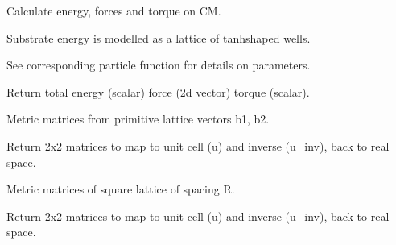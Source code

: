 \documentclass[letterpaper,10pt,english]{sphinxmanual}
\begin{document}
\begin{fulllineitems}
\label{\detokenize{tool_create_substrate:tool_create_substrate.calc_en_tanh}}
\pysigstartsignatures
{}
\pysigstopsignatures
\sphinxAtStartPar
Calculate energy, forces and torque on CM.

\sphinxAtStartPar
Substrate energy is modelled as a lattice of tanh\sphinxhyphen{}shaped wells.

\sphinxAtStartPar
See corresponding particle function for details on parameters.

\sphinxAtStartPar
Return total energy (scalar) force (2d vector) torque (scalar).

\end{fulllineitems}


\begin{fulllineitems}
\label{\detokenize{tool_create_substrate:tool_create_substrate.calc_matrices_bvect}}
\pysigstartsignatures
{}
\pysigstopsignatures
\sphinxAtStartPar
Metric matrices from primitive lattice vectors b1, b2.

\sphinxAtStartPar
Return 2x2 matrices to map to unit cell (u) and inverse (u\_inv), back to real space.

\end{fulllineitems}


\begin{fulllineitems}
\label{\detokenize{tool_create_substrate:tool_create_substrate.calc_matrices_square}}
\pysigstartsignatures
{}
\pysigstopsignatures
\sphinxAtStartPar
Metric matrices of square lattice of spacing R.

\sphinxAtStartPar
Return 2x2 matrices to map to unit cell (u) and inverse (u\_inv), back to real space.

\end{fulllineitems}
\end{document}
